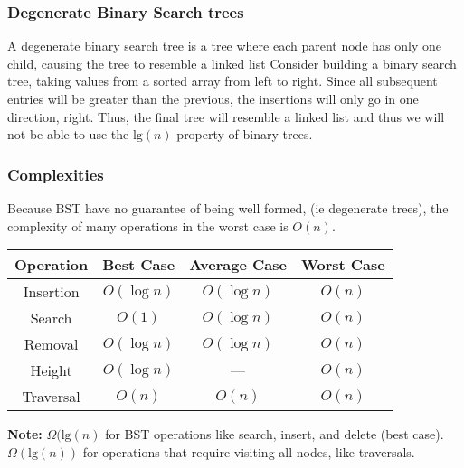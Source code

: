 \documentclass{report}
\begin{document}
    \pagebreak 
    \subsubsection{Degenerate Binary Search trees}
    \bigbreak \noindent 
    A degenerate binary search tree is a tree where each parent node has only one child, causing the tree to resemble a linked list
    \bigbreak \noindent 
    Consider building a binary search tree, taking values from a sorted array from left to right. Since all subsequent entries will be greater than the previous, the insertions will only go in one direction, right. Thus, the final tree will resemble a linked list and thus we will not be able to use the $\text{lg}(n)$ property of binary trees.

    \pagebreak 
    \subsubsection{Complexities}
    \bigbreak \noindent 
    Because BST have no guarantee of being well formed, (ie degenerate trees), the complexity of many operations in the worst case is $O(n)$.
    \bigbreak \noindent 
    \begin{center}
        \begin{tabular}{|c|c|c|c|}
            \hline
            \textbf{Operation} & \textbf{Best Case} & \textbf{Average Case} & \textbf{Worst Case} \\ \hline
            Insertion & \( O(\log n) \) & \( O(\log n) \) & \( O(n) \) \\ \hline
            Search & \( O(1) \) & \( O(\log n) \) & \( O(n) \) \\ \hline
            Removal & \( O(\log n) \) & \( O(\log n) \) & \( O(n) \) \\ \hline
            Height & \( O(\log n) \) & --- & \( O(n) \) \\ \hline
            Traversal & \( O(n) \) & \( O(n) \) & \( O(n) \) \\ \hline
        \end{tabular}
    \end{center}
    \bigbreak \noindent 
    \textbf{Note:} $\Omega(\text{lg}(n)$ for BST operations like search, insert, and delete (best case).
    \bigbreak \noindent 
    $\Omega(\text{lg}(n))$ for operations that require visiting all nodes, like traversals.
\end{document}
